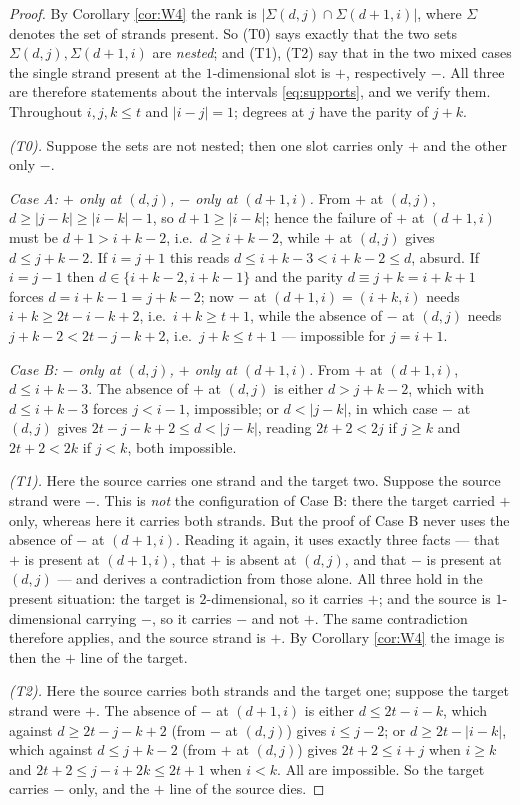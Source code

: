 \documentclass[reqno]{amsart}
\theoremstyle{plain}
\theoremstyle{definition}
\begin{document}
\begin{proof}
By Corollary \ref{cor:W4} the rank is $|\Sigma(d,j)\cap\Sigma(d+1,i)|$, where
$\Sigma$ denotes the set of strands present.  So (T0) says exactly that the two
sets $\Sigma(d,j),\Sigma(d+1,i)$ are \emph{nested}; and (T1), (T2) say that in
the two mixed cases the single strand present at the $1$-dimensional slot is
$+$, respectively $-$.  All three are therefore statements about the intervals
\eqref{eq:supports}, and we verify them.  Throughout $i,j,k\le t$ and
$|i-j|=1$; degrees at $j$ have the parity of $j+k$.

\emph{(T0).}  Suppose the sets are not nested; then one slot carries only $+$
and the other only $-$.

\emph{Case A: $+$ only at $(d,j)$, $-$ only at $(d+1,i)$.}  From $+$ at
$(d,j)$, $d\ge|j-k|\ge|i-k|-1$, so $d+1\ge|i-k|$; hence the failure of $+$ at
$(d+1,i)$ must be $d+1>i+k-2$, i.e.\ $d\ge i+k-2$, while $+$ at $(d,j)$ gives
$d\le j+k-2$.  If $i=j+1$ this reads $d\le i+k-3<i+k-2\le d$, absurd.  If
$i=j-1$ then $d\in\{i+k-2,i+k-1\}$ and the parity $d\equiv j+k=i+k+1$ forces
$d=i+k-1=j+k-2$; now $-$ at $(d+1,i)=(i+k,i)$ needs $i+k\ge2t-i-k+2$, i.e.\
$i+k\ge t+1$, while the absence of $-$ at $(d,j)$ needs $j+k-2<2t-j-k+2$, i.e.\
$j+k\le t+1$ --- impossible for $j=i+1$.

\emph{Case B: $-$ only at $(d,j)$, $+$ only at $(d+1,i)$.}  From $+$ at
$(d+1,i)$, $d\le i+k-3$.  The absence of $+$ at $(d,j)$ is either $d>j+k-2$,
which with $d\le i+k-3$ forces $j<i-1$, impossible; or $d<|j-k|$, in which case
$-$ at $(d,j)$ gives $2t-j-k+2\le d<|j-k|$, reading $2t+2<2j$ if $j\ge k$ and
$2t+2<2k$ if $j<k$, both impossible.

\emph{(T1).}  Here the source carries one strand and the target two.  Suppose
the source strand were $-$.  This is \emph{not} the configuration of Case B:
there the target carried $+$ only, whereas here it carries both strands.  But
the proof of Case B never uses the absence of $-$ at $(d+1,i)$.  Reading it
again, it uses exactly three facts --- that $+$ is present at $(d+1,i)$, that
$+$ is absent at $(d,j)$, and that $-$ is present at $(d,j)$ --- and derives a
contradiction from those alone.  All three hold in the present situation: the
target is $2$-dimensional, so it carries $+$; and the source is
$1$-dimensional carrying $-$, so it carries $-$ and not $+$.  The same
contradiction therefore applies, and the source strand is $+$.  By Corollary
\ref{cor:W4} the image is then the $+$ line of the target.

\emph{(T2).}  Here the source carries both strands and the target one; suppose
the target strand were $+$.  The absence of $-$ at $(d+1,i)$ is either
$d\le 2t-i-k$, which against $d\ge2t-j-k+2$ (from $-$ at $(d,j)$) gives
$i\le j-2$; or $d\ge2t-|i-k|$, which against $d\le j+k-2$ (from $+$ at $(d,j)$)
gives $2t+2\le i+j$ when $i\ge k$ and $2t+2\le j-i+2k\le2t+1$ when $i<k$.  All
are impossible.  So the target carries $-$ only, and the $+$ line of the source
dies.
\end{proof}
\end{document}
